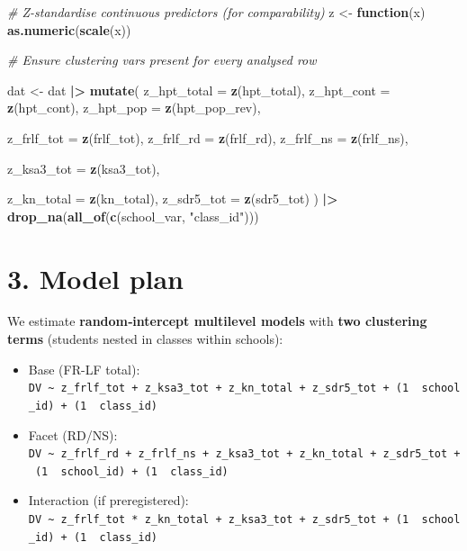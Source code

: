\documentclass[
  10pt,
]{article}
\newenvironment{Shaded}{\begin{snugshade}}{\end{snugshade}}
\newcommand{\AttributeTok}[1]{\textcolor[rgb]{0.13,0.29,0.53}{#1}}
\newcommand{\CommentTok}[1]{\textcolor[rgb]{0.56,0.35,0.01}{\textit{#1}}}
\newcommand{\ControlFlowTok}[1]{\textcolor[rgb]{0.13,0.29,0.53}{\textbf{#1}}}
\newcommand{\FunctionTok}[1]{\textcolor[rgb]{0.13,0.29,0.53}{\textbf{#1}}}
\newcommand{\NormalTok}[1]{#1}
\newcommand{\OtherTok}[1]{\textcolor[rgb]{0.56,0.35,0.01}{#1}}
\newcommand{\SpecialCharTok}[1]{\textcolor[rgb]{0.81,0.36,0.00}{\textbf{#1}}}
\newcommand{\StringTok}[1]{\textcolor[rgb]{0.31,0.60,0.02}{#1}}
\providecommand{\tightlist}{%
  \setlength{\itemsep}{0pt}\setlength{\parskip}{0pt}}
\begin{document}
\begin{Shaded}
\begin{Highlighting}[]
\CommentTok{\# Z{-}standardise continuous predictors (for comparability)}
\NormalTok{z }\OtherTok{\textless{}{-}} \ControlFlowTok{function}\NormalTok{(x) }\FunctionTok{as.numeric}\NormalTok{(}\FunctionTok{scale}\NormalTok{(x))}

\CommentTok{\# Ensure clustering vars present for every analysed row}

\NormalTok{dat }\OtherTok{\textless{}{-}}\NormalTok{ dat }\SpecialCharTok{|\textgreater{}}
  \FunctionTok{mutate}\NormalTok{(}
    \AttributeTok{z\_hpt\_total =} \FunctionTok{z}\NormalTok{(hpt\_total),}
    \AttributeTok{z\_hpt\_cont  =} \FunctionTok{z}\NormalTok{(hpt\_cont),}
    \AttributeTok{z\_hpt\_pop   =} \FunctionTok{z}\NormalTok{(hpt\_pop\_rev),}

    \AttributeTok{z\_frlf\_tot =} \FunctionTok{z}\NormalTok{(frlf\_tot),}
    \AttributeTok{z\_frlf\_rd  =} \FunctionTok{z}\NormalTok{(frlf\_rd),}
    \AttributeTok{z\_frlf\_ns  =} \FunctionTok{z}\NormalTok{(frlf\_ns),}

    \AttributeTok{z\_ksa3\_tot =} \FunctionTok{z}\NormalTok{(ksa3\_tot),}

    \AttributeTok{z\_kn\_total =} \FunctionTok{z}\NormalTok{(kn\_total),}
    \AttributeTok{z\_sdr5\_tot =} \FunctionTok{z}\NormalTok{(sdr5\_tot)}
\NormalTok{  ) }\SpecialCharTok{|\textgreater{}}
  \FunctionTok{drop\_na}\NormalTok{(}\FunctionTok{all\_of}\NormalTok{(}\FunctionTok{c}\NormalTok{(school\_var, }\StringTok{"class\_id"}\NormalTok{)))}
\end{Highlighting}
\end{Shaded}

\hypertarget{model-plan}{%
\section{3. Model plan}\label{model-plan}}

We estimate \textbf{random‐intercept multilevel models} with \textbf{two
clustering terms} (students nested in classes within schools):

\begin{itemize}
\tightlist
\item
  Base (FR-LF total):
  \texttt{DV\ \textasciitilde{}\ z\_frlf\_tot\ +\ z\_ksa3\_tot\ +\ z\_kn\_total\ +\ z\_sdr5\_tot\ +\ (1\ \textbar{}\ school\_id)\ +\ (1\ \textbar{}\ class\_id)}
\item
  Facet (RD/NS):
  \texttt{DV\ \textasciitilde{}\ z\_frlf\_rd\ +\ z\_frlf\_ns\ +\ z\_ksa3\_tot\ +\ z\_kn\_total\ +\ z\_sdr5\_tot\ +\ (1\ \textbar{}\ school\_id)\ +\ (1\ \textbar{}\ class\_id)}
\item
  Interaction (if preregistered):
  \texttt{DV\ \textasciitilde{}\ z\_frlf\_tot\ *\ z\_kn\_total\ +\ z\_ksa3\_tot\ +\ z\_sdr5\_tot\ +\ (1\ \textbar{}\ school\_id)\ +\ (1\ \textbar{}\ class\_id)}
\end{itemize}
\end{document}
